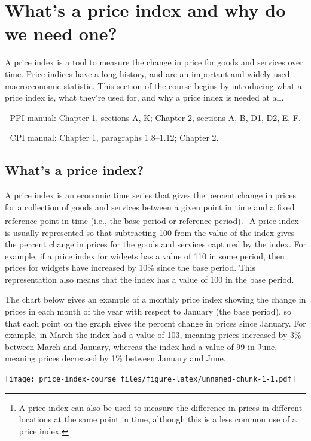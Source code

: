 \documentclass[]{article}
\begin{document}
\hypertarget{whats-a-price-index-and-why-do-we-need-one}{%
\section{What's a price index and why do we need one?}\label{whats-a-price-index-and-why-do-we-need-one}}

A price index is a tool to measure the change in price for goods and services over time. Price indices have a long history, and are an important and widely used macroeconomic statistic. This section of the course begins by introducing what a price index is, what they're used for, and why a price index is needed at all.

📖 PPI manual: Chapter 1, sections A, K; Chapter 2, sections A, B, D1, D2, E, F.

📖 CPI manual: Chapter 1, paragraphs 1.8--1.12; Chapter 2.

\hypertarget{whats-a-price-index}{%
\subsection{What's a price index?}\label{whats-a-price-index}}

A price index is an economic time series that gives the percent change in prices for a collection of goods and services between a given point in time and a fixed reference point in time (i.e., the base period or reference period).\footnote{A price index can also be used to measure the difference in prices in different locations at the same point in time, although this is a less common use of a price index.} A price index is usually represented so that subtracting 100 from the value of the index gives the percent change in prices for the goods and services captured by the index. For example, if a price index for widgets has a value of 110 in some period, then prices for widgets have increased by 10\% since the base period. This representation also means that the index has a value of 100 in the base period.

The chart below gives an example of a monthly price index showing the change in prices in each month of the year with respect to January (the base period), so that each point on the graph gives the percent change in prices since January. For example, in March the index had a value of 103, meaning prices increased by 3\% between March and January, whereas the index had a value of 99 in June, meaning prices decreased by 1\% between January and June.

\texttt{[image: price-index-course\_files/figure-latex/unnamed-chunk-1-1.pdf]}
\end{document}
